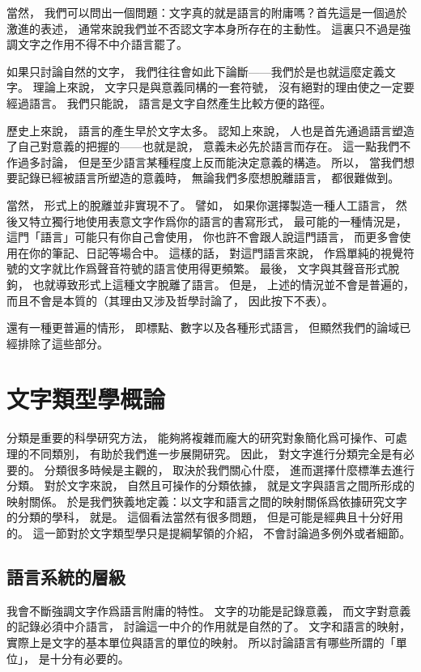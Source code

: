 當然，
我們可以問出一個問題：文字真的就是語言的附庸嗎？首先這是一個過於激進的表述，
通常來說我們並不否認文字本身所存在的主動性。
這裏只不過是強調文字之作用不得不中介語言罷了。

如果只討論自然的文字，
我們往往會如此下論斷——我們於是也就這麼定義文字。
理論上來說，
文字只是與意義同構的一套符號，
沒有絕對的理由使之一定要經過語言。
我們只能說，
語言是文字自然產生比較方便的路徑。

歷史上來說，
語言的產生早於文字太多。
認知上來說，
人也是首先通過語言塑造了自己對意義的把握的——也就是說，
意義未必先於語言而存在。
這一點我們不作過多討論，
但是至少語言某種程度上反而能決定意義的構造。
所以，
當我們想要記錄已經被語言所塑造的意義時，
無論我們多麼想脫離語言，
都很難做到。

當然，
形式上的脫離並非實現不了。
譬如，
如果你選擇製造一種人工語言，
然後又特立獨行地使用表意文字作爲你的語言的書寫形式，
最可能的一種情況是，
這門「語言」可能只有你自己會使用，
你也許不會跟人說這門語言，
而更多會使用在你的筆記、日記等場合中。
這樣的話，
對這門語言來說，
作爲單純的視覺符號的文字就比作爲聲音符號的語言使用得更頻繁。
最後，
文字與其聲音形式脫鉤，
也就導致形式上這種文字脫離了語言。
但是，
上述的情況並不會是普遍的，
而且不會是本質的（其理由又涉及哲學討論了，
因此按下不表）。

還有一種更普遍的情形，
即標點、數字以及各種形式語言，
但顯然我們的論域已經排除了這些部分。

\section{文字類型學概論}
分類是重要的科學研究方法，
能夠將複雜而龐大的研究對象簡化爲可操作、可處理的不同類別，
有助於我們進一步展開研究。
因此，
對文字進行分類完全是有必要的。
分類很多時候是主觀的，
取決於我們關心什麼，
進而選擇什麼標準去進行分類。
對於文字來說，
自然且可操作的分類依據，
就是文字與語言之間所形成的映射關係。
於是我們狹義地定義：以文字和語言之間的映射關係爲依據研究文字的分類的學科，
就是。
這個看法當然有很多問題，
但是可能是經典且十分好用的。
這一節對於文字類型學只是提綱挈領的介紹，
不會討論過多例外或者細節。

\subsection{語言系統的層級}

我會不斷強調文字作爲語言附庸的特性。
文字的功能是記錄意義，
而文字對意義的記錄必須中介語言，
討論這一中介的作用就是自然的了。
文字和語言的映射，
實際上是文字的基本單位與語言的單位的映射。
所以討論語言有哪些所謂的「單位」，
是十分有必要的。

